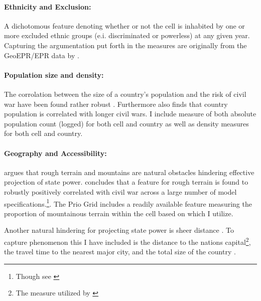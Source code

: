 \documentclass[a4paper]{article}
\begin{document}
\paragraph{Ethnicity and Exclusion:} A dichotomous feature denoting whether or not the cell is inhabited by one or more excluded ethnic groups (e.i.  discriminated or powerless) at any given year. Capturing the argumentation put forth in \cite{Cederman_Weidmann_Gleditsch_2011, Cederman_Gleditsch_Buhaug_2013} the measures are originally from the GeoEPR/EPR data by \cite{Vogt_2015}.\par

\paragraph{Population size and density:} The corrolation between the size of a country's population and the risk of civil war have been found rather robust \citep{Collier_Hoeffler_1998, Fearon_Laitin_2003, Collier_Hoeffler_2004, Hegre_Sambanis_2006}. Furthermore \cite[287]{Fearon_2004} also finds that country population is correlated with longer civil wars. I include measure of both absolute population count (logged) for both cell and country as well as density measures for both cell and country.\par

\paragraph{Geography and Accessibility:} \cite{Fearon_Laitin_2003} argues that rough terrain and mountains are natural obstacles hindering effective projection of state power. \cite{Hegre_Sambanis_2006} concludes that a feature for rough terrain is found to robustly positively correlated with civil war across a large number of model specifications.\cite[526-529]{Hegre_Sambanis_2006}\footnote{Though see \cite{Goldstone_2010}}. The Prio Grid includes a readily available feature measuring the proportion of mountainous terrain within the cell based on \cite{Blyth_2002} which I utilize.\par

Another natural hindering for projecting state power is sheer distance \citep{Fearon_2004, Buhaug_Gates_Lujala_2009, Cederman_Buhaug_Roed_2009, Buhaug_2010}. To capture phenomenon this I have included is the distance to the nations capital\footnote{The measure utilized by \cite{Buhaug_2010}}, the travel time to the nearest major city, and the total size of the country \citep{prio_code_2015}.\par
\end{document}
